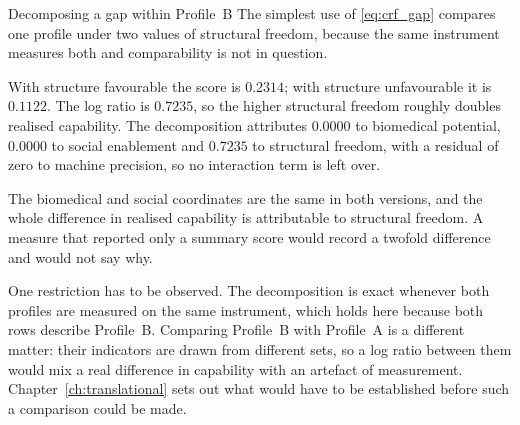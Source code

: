 \begin{workedexample}{Decomposing a gap within Profile~B}
The simplest use of \eqref{eq:crf_gap} compares one profile under two values
of structural freedom, because the same instrument measures both and
comparability is not in question.


\noindent With structure favourable the score is $0.2314$; with structure
unfavourable it is $0.1122$. The log ratio is $0.7235$, so the higher structural
freedom roughly doubles realised capability. The decomposition
attributes $0.0000$ to biomedical potential, $0.0000$ to social enablement and
$0.7235$ to structural freedom, with a residual of zero to machine precision, so
no interaction term is left over.

The biomedical and social coordinates are the same in both versions, and the
whole difference in realised capability is attributable to structural freedom.
A measure that reported only a summary score would record a twofold difference
and would not say why.

One restriction has to be observed. The decomposition is exact whenever both
profiles are measured on the same instrument, which holds here because both
rows describe Profile~B. Comparing Profile~B with Profile~A is a different
matter: their indicators are drawn from different sets, so a log ratio between them would mix
a real difference in capability with an artefact of measurement.
Chapter~\ref{ch:translational} sets out what would have to be established
before such a comparison could be made.

\end{workedexample}

